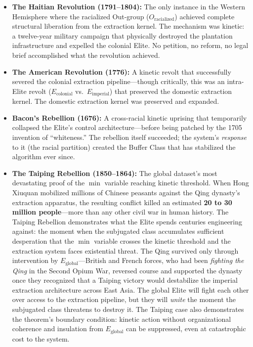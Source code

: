 \begin{itemize}
    \item \textbf{The Haitian Revolution (1791--1804):} The only instance in the Western Hemisphere where the racialized Out-group ($O_{\text{racialized}}$) achieved complete structural liberation from the extraction kernel. The mechanism was kinetic: a twelve-year military campaign that physically destroyed the plantation infrastructure and expelled the colonial Elite. No petition, no reform, no legal brief accomplished what the revolution achieved.

    \item \textbf{The American Revolution (1776):} A kinetic revolt that successfully severed the colonial extraction pipeline---though critically, this was an intra-Elite revolt ($E_{\text{colonial}}$ vs.\ $E_{\text{imperial}}$) that preserved the domestic extraction kernel. The domestic extraction kernel was preserved and expanded.

    \item \textbf{Bacon's Rebellion (1676):} A cross-racial kinetic uprising that temporarily collapsed the Elite's control architecture---before being patched by the 1705 invention of ``whiteness.'' The rebellion itself succeeded; the system's \textit{response} to it (the racial partition) created the Buffer Class that has stabilized the algorithm ever since.

    \item \textbf{The Taiping Rebellion (1850--1864):} The global dataset's most devastating proof of the $\min$ variable reaching kinetic threshold. When Hong Xiuquan mobilized millions of Chinese peasants against the Qing dynasty's extraction apparatus, the resulting conflict killed an estimated \textbf{20 to 30 million people}---more than any other civil war in human history. The Taiping Rebellion demonstrates what the Elite spends centuries engineering against: the moment when the subjugated class accumulates sufficient desperation that the $\min$ variable crosses the kinetic threshold and the extraction system faces existential threat. The Qing survived only through intervention by $E_{\text{global}}$---British and French forces, who had been \textit{fighting the Qing} in the Second Opium War, reversed course and supported the dynasty once they recognized that a Taiping victory would destabilize the imperial extraction architecture across East Asia. The global Elite will fight each other over access to the extraction pipeline, but they will \textit{unite} the moment the subjugated class threatens to destroy it. The Taiping case also demonstrates the theorem's boundary condition: kinetic action without organizational coherence and insulation from $E_{\text{global}}$ can be suppressed, even at catastrophic cost to the system.
\end{itemize}

